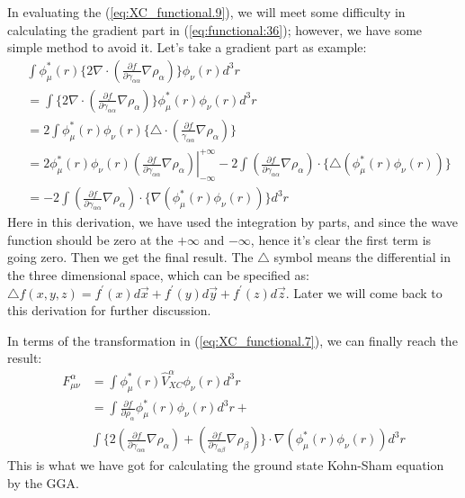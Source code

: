 In evaluating the (\ref{eq:XC_functional.9}), we will meet some
difficulty in calculating the gradient part in
(\ref{eq:functional:36}); however, we have some simple method to
avoid it. Let's take a gradient part as example:
\begin{equation}
  \label{eq:XC_functional.7}
  \begin{split}
    & \int \phi^{*}_{\mu}(r) \Bigg\{2\nabla\cdot \left( \frac{\partial
        f} {\partial \gamma_{\alpha\alpha}}
      \nabla\rho_{\alpha}\right)\Bigg\}\phi_{\nu}(r) d^{3}r  \\
    &=\int \Bigg\{2\nabla\cdot \left( \frac{\partial f} {\partial
        \gamma_{\alpha\alpha}}
      \nabla\rho_{\alpha}\right)\Bigg\}\phi^{*}_{\mu}(r) \phi_{\nu}(r)
    d^{3}r  \\
    &= 2\int \phi^{*}_{\mu}(r) \phi_{\nu}(r)\Bigg\{
\triangle\cdot\left(
      \frac{\partial f} { \gamma_{\alpha\alpha}}
      \nabla\rho_{\alpha}\right) \Bigg\} \\
    &= 2\phi^{*}_{\mu}(r) \phi_{\nu}(r)\left. \left( \frac{\partial f}
        {\partial \gamma_{\alpha\alpha}}
        \nabla\rho_{\alpha}\right)\right|^{+\infty}_{-\infty} - 2\int
    \left( \frac{\partial f} {\partial \gamma_{\alpha\alpha}}     
\nabla\rho_{\alpha}\right)\cdotp\Big\{\triangle(\phi^{*}_{\mu}(r)
\phi_{\nu}(r))\Big\} \\
    &= - 2\int \left( \frac{\partial f} {\partial
        \gamma_{\alpha\alpha}}     
\nabla\rho_{\alpha}\right)\cdotp\Big\{\nabla(\phi^{*}_{\mu}(r)
    \phi_{\nu}(r))\Big\}d^{3}r
  \end{split}
\end{equation}
Here in this derivation, we have used the integration by parts, and
since the wave function should be zero at the $+\infty$ and $-\infty$,
hence it's clear the first term is going zero. Then we get the final
result. The $\triangle$ symbol means the differential in the three
dimensional space, which can be specified as: $\triangle
f(x,y,z) = f^{'}(x)d\vec{x} + f^{'}(y)d\vec{y} + f^{'}(z)d\vec{z}$.
Later we will come back to this derivation for further discussion.

In terms of the transformation in (\ref{eq:XC_functional.7}), we can
finally reach the result:
\begin{equation}
  \label{eq:XC_functional.8}
  \begin{split}
      F^{\alpha}_{\mu\nu} &= \int
  \phi^{*}_{\mu}(r)\hat{V}^{\alpha}_{XC}\phi_{\nu}(r) d^{3}r  \\
  &= \int \frac{\partial f}{\partial
      \rho_{\alpha}}\phi^{*}_{\mu}(r) \phi_{\nu}(r)d^{3}r + \\
  &\int\Bigg\{2\left( \frac{\partial f} {\partial
\gamma_{\alpha\alpha}}
    \nabla\rho_{\alpha}\right) + \left( \frac{\partial f} {\partial
      \gamma_{\alpha\beta}} \nabla\rho_{\beta} \right)
  \Bigg\}\cdot\nabla(\phi^{*}_{\mu}(r) \phi_{\nu}(r))d^{3}r
  \end{split}
\end{equation}
This is what we have got for calculating the ground state Kohn-Sham
equation by the GGA.

